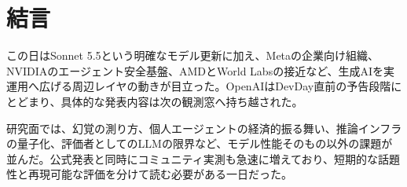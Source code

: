 \section*{結言}
この日はSonnet 5.5という明確なモデル更新に加え、Metaの企業向け組織、NVIDIAのエージェント安全基盤、AMDとWorld Labsの接近など、生成AIを実運用へ広げる周辺レイヤの動きが目立った。OpenAIはDevDay直前の予告段階にとどまり、具体的な発表内容は次の観測窓へ持ち越された。

研究面では、幻覚の測り方、個人エージェントの経済的振る舞い、推論インフラの量子化、評価者としてのLLMの限界など、モデル性能そのもの以外の課題が並んだ。公式発表と同時にコミュニティ実測も急速に増えており、短期的な話題性と再現可能な評価を分けて読む必要がある一日だった。
